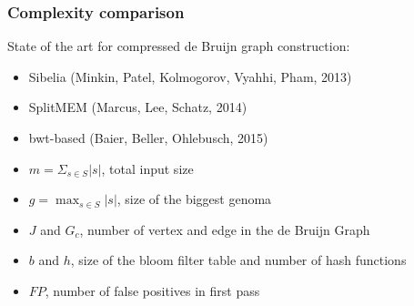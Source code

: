 \begin{frame}
	\frametitle{Complexity comparison}
	
	\centering
	
	
  State of the art for compressed de Bruijn graph construction:
  
	  \begin{itemize}
	    \item Sibelia (Minkin, Patel, Kolmogorov, Vyahhi, Pham, 2013)
	    \item SplitMEM (Marcus, Lee, Schatz, 2014)
	    \item bwt-based (Baier, Beller, Ohlebusch, 2015)
	  \end{itemize}

	
	  \medskip
	  
        
    \medskip

	
    \begin{itemize}
      \item $m = \Sigma_{s \in S}{ |s| }$, total input size
      \item $g = \max_{s \in S}{ |s| }$, size of the biggest genoma
      \item $J$ and $G_{c}$, number of vertex and edge in the de Bruijn Graph
      \item $b$ and $h$, size of the bloom filter table and number of hash functions
      \item $FP$, number of false positives in first pass
    \end{itemize}
    

\end{frame}

